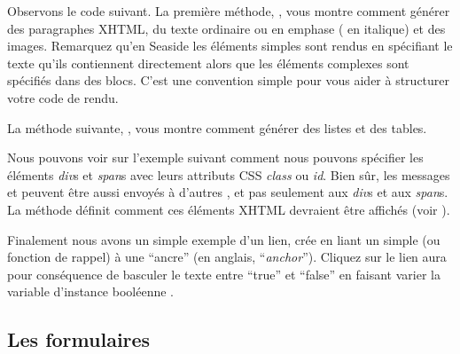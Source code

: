 \documentclass[a4paper,10pt,twoside]{book}
\begin{document}
Observons le code suivant.
La première méthode, , vous
montre comment générer des paragraphes XHTML, du texte ordinaire ou en
emphase (\ie{} en italique) et des images.
Remarquez qu'en Seaside les éléments simples sont rendus en spécifiant
le texte qu'ils contiennent directement alors que les éléments
complexes sont spécifiés dans des blocs.
C'est une convention simple pour vous aider à structurer votre code de
rendu.


La méthode suivante, ,
vous montre comment générer des listes et des tables.


Nous pouvons voir sur l'exemple suivant comment nous pouvons spécifier
les éléments \emph{div}s et \emph{span}s avec leurs attributs CSS
\emph{class} ou \emph{id}.
Bien sûr, les messages  et  peuvent être aussi
envoyés à d'autres \brushes, et pas seulement aux \emph{div}s et aux
\emph{span}s.
La méthode  définit comment ces éléments
XHTML devraient être affichés (voir ).


Finalement nous avons un simple exemple d'un lien, crée en liant un
simple  (ou fonction de rappel) à une
``ancre'' (en anglais, ``\emph{anchor}'').
Cliquez sur le lien aura pour conséquence de basculer le texte entre
``true'' et ``false'' en faisant varier la variable d'instance
booléenne .



\subsection{Les formulaires}
\end{document}
